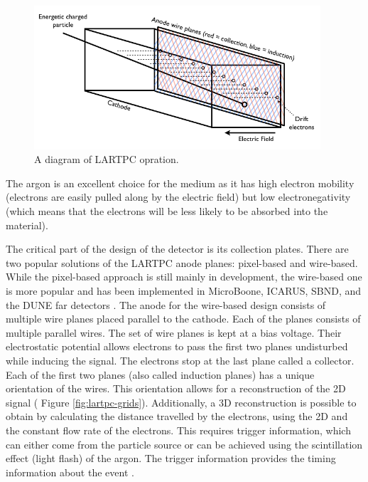 \begin{figure}[ht]
\centering
\includegraphics[width=0.95\textwidth]{figures/chapter6/RealSchematicTPC.png}
\caption[caption for LOF]{A diagram of LARTPC opration\footnotemark. }
\label{fig:lartpc-scheme}
\end{figure}

The argon is an excellent choice for the medium as it has high electron mobility (electrons are easily pulled along by the electric field) but low electronegativity (which means that the electrons will be less likely to be absorbed into the material).

The critical part of the design of the detector is its collection plates. There are two popular solutions of the LARTPC anode planes: pixel-based and wire-based. While the pixel-based approach is still mainly in development, the wire-based one is more popular and has been implemented in  MicroBoone, ICARUS, SBND, and the DUNE far detectors \cite{adams2020pilarnet}.
The anode for the wire-based design consists of multiple wire planes placed parallel to the cathode.
Each of the planes consists of multiple parallel wires.
The set of wire planes is kept at a bias voltage. Their electrostatic potential allows electrons to pass the first two planes undisturbed while inducing the signal. The electrons stop at the last plane called a collector.
Each of the first two planes (also called induction planes) has a unique orientation of the wires.
This orientation allows for a reconstruction of the 2D signal ( Figure \ref{fig:lartpc-grids}).
Additionally, a 3D reconstruction is possible to obtain by calculating the distance travelled by the electrons, using the 2D and the constant flow rate of the electrons.
This requires trigger information, which can either come from the particle source or can be achieved using the scintillation effect (light flash) of the argon.
The trigger information provides the timing information about the event \cite{microboone}.

